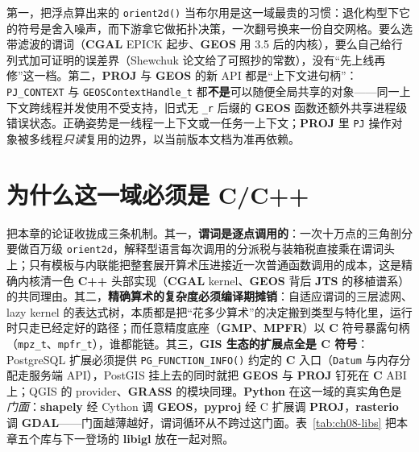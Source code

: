 \documentclass[12pt,a4paper,fontset=fandol]{ctexbook}
\newcommand{\Fn}[1]{\texttt{#1()}}
\newcommand{\Tp}[1]{\texttt{#1}}
\newcommand{\Lib}[1]{\textbf{#1}}
\newcommand{\Lang}[1]{\textsf{\bfseries #1}}
\newcommand{\CL}{\Lang{C}}
\newcommand{\CPP}{\Lang{C++}}
\newcommand{\PY}{\Lang{Python}}
\begin{document}
\begin{warning}[title={谓词布尔化与共享上下文}]
第一，把浮点算出来的 \Fn{orient2d} 当布尔用是这一域最贵的习惯：退化构型下它的符号是舍入噪声，而下游拿它做拓扑决策，一次翻号换来一份自交网格。要么选带滤波的谓词（\Lib{CGAL} EPICK 起步、\Lib{GEOS} 用 3.5 后的内核），要么自己给行列式加可证明的误差界（Shewchuk 论文给了可照抄的常数），没有``先上线再修''这一档。第二，\Lib{PROJ} 与 \Lib{GEOS} 的新 API 都是``上下文进句柄''：\Tp{PJ\_CONTEXT} 与 \Tp{GEOSContextHandle\_t} 都\textbf{不是}可以随便全局共享的对象——同一上下文跨线程并发使用不受支持，旧式无 \Tp{\_r} 后缀的 \Lib{GEOS} 函数还额外共享进程级错误状态。正确姿势是一线程一上下文或一任务一上下文；\Lib{PROJ} 里 \Tp{PJ} 操作对象被多线程\emph{只读}复用的边界，以当前版本文档为准再依赖。
\end{warning}

\section{为什么这一域必须是 \CL/\CPP{}}

把本章的论证收拢成三条机制。其一，\textbf{谓词是逐点调用的}：一次十万点的三角剖分要做百万级 \Tp{orient2d}，解释型语言每次调用的分派税与装箱税直接乘在谓词头上；只有模板与内联能把整套展开算术压进接近一次普通函数调用的成本，这是精确内核清一色 \CPP{} 头部实现（\Lib{CGAL} kernel、\Lib{GEOS} 背后 \Lib{JTS} 的移植谱系）的共同理由。其二，\textbf{精确算术的复杂度必须编译期摊销}：自适应谓词的三层滤网、lazy kernel 的表达式树，本质都是把``花多少算术''的决定搬到类型与特化里，运行时只走已经定好的路径；而任意精度底座（\Lib{GMP}、\Lib{MPFR}）以 \CL{} 符号暴露句柄（\Tp{mpz\_t}、\Tp{mpfr\_t}），谁都能链。其三，\textbf{GIS 生态的扩展点全是 C 符号}：PostgreSQL 扩展必须提供 \Tp{PG\_FUNCTION\_INFO()} 约定的 \CL{} 入口（\Tp{Datum} 与内存分配走服务端 API），PostGIS 挂上去的同时就把 \Lib{GEOS} 与 \Lib{PROJ} 钉死在 \CL{} ABI 上；QGIS 的 provider、\Lib{GRASS} 的模块同理。\PY{} 在这一域的真实角色是\emph{门面}：\Lib{shapely} 经 Cython 调 \Lib{GEOS}，\Lib{pyproj} 经 C 扩展调 \Lib{PROJ}，\Lib{rasterio} 调 \Lib{GDAL}——门面越薄越好，谓词循环从不跨过这门面。表~\ref{tab:ch08-libs} 把本章五个库与下一登场的 \Lib{libigl} 放在一起对照。
\end{document}

